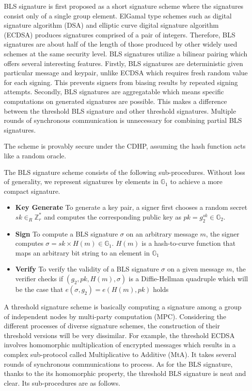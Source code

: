\documentclass[11pt]{article}
\begin{document}
BLS signature is first proposed as a short signature scheme where the signatures consist only of a single group element. ElGamal type schemes such as digital signature algorithm (DSA) and elliptic curve digital signature algorithm (ECDSA) produces signatures comprised of a pair of integers. Therefore, BLS signatures are about half of the length of those produced by other widely used schemes at the same security level\cite{menezes2009introduction}. BLS signatures utilize a bilinear pairing which offers several interesting features. Firstly, BLS signatures are deterministic given particular message and keypair, unlike ECDSA which requires fresh random value for each signing. This prevents signers from biasing results by repeated signing attempts. Secondly, BLS signatures are aggregatable which means specific computations on generated signatures are possible. This makes a difference between the threshold BLS signature and other threshold signatures. Multiple rounds of synchronous communication is unnecessary for combining partial BLS signatures.

The scheme is provably secure under the CDHP, assuming the hash function acts like a random oracle.

The BLS signature scheme consists of the following sub-procedures. Without loss of generality, we represent signatures by elements in $\mathbb{G}_1$ to achieve a more compact signature.
\begin{itemize}
    \item[] \textbf{Key Generate} To generate a key pair, a signer first chooses a random secret $sk \in_R \mathbb{Z}_r^*$ and computes the corresponding public key as $pk = g_2^{sk} \in \mathbb{G}_2$.
    \item[] \textbf{Sign} To compute a BLS signature $\sigma$ on an arbitrary message $m$, the signer computes $\sigma = sk \times H(m) \in \mathbb{G}_1$. $H(m)$ is a hash-to-curve function that maps an arbitrary bit string to an element in $\mathbb{G}_1$
    \item[] \textbf{Verify} To verify the validity of a BLS signature $\sigma$ on a given message $m$, the verifier checks if $(g_2,pk,H(m),\sigma)$ is a Diffie-Hellman quadruple which will be the case that $e(\sigma,g_2)=e(H(m),pk)$ holds
\end{itemize}

A threshold signature scheme is basically computing a signature among a group of independent nodes by multi-party computation (MPC). Considering the different processes of diverse signature schemes, the construction of their threshold versions will be very dissimilar. For example, the threshold ECDSA involves homomorphic multiplication of encrypted messages which results in a complex sub-protocol called Multiplicative to Additive (MtA). It takes several rounds of synchronous communications to process. As for the BLS signature, thanks to the its homomorphic property, the threshold BLS signature is neat and clear. Its sub-procedures are as follows.
\end{document}
